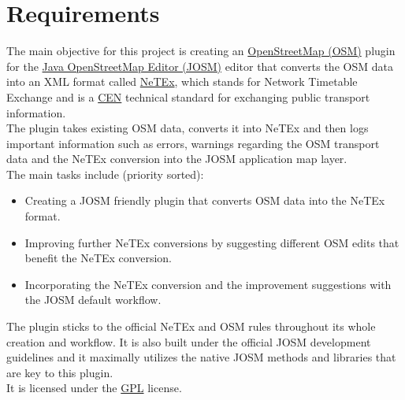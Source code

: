 \section{Requirements}
The main objective for this project is creating an \href{https://en.wikipedia.org/wiki/OpenStreetMap}{OpenStreetMap (OSM)} plugin for the \href{https://josm.openstreetmap.de/}{Java OpenStreetMap Editor (JOSM)} editor that converts the OSM data into an XML format called \href{https://en.wikipedia.org/wiki/NeTEx}{NeTEx}, which stands for Network Timetable Exchange and is a \href{https://en.wikipedia.org/wiki/European_Committee_for_Standardization}{CEN} technical standard for exchanging public transport information.\\
The plugin takes existing OSM data, converts it into NeTEx and then logs important information such as errors, warnings regarding the OSM transport data and the NeTEx conversion into the JOSM application map layer.\\
\newline
The main tasks include (priority sorted): 
\begin{itemize}
	\item Creating a JOSM friendly plugin that converts OSM data into the NeTEx format.
	\item Improving further NeTEx conversions by suggesting different OSM edits that benefit the NeTEx conversion.
	\item Incorporating the NeTEx conversion and the improvement suggestions with the JOSM default workflow.
\end{itemize}
The plugin sticks to the official NeTEx and OSM rules throughout its whole creation and workflow. It is also built under the official JOSM development guidelines and it maximally utilizes the native JOSM methods and libraries that are key to this plugin.\\
It is licensed under the \href{https://www.gnu.org/licenses/gpl-3.0.en.html}{GPL} license.
\newpage
